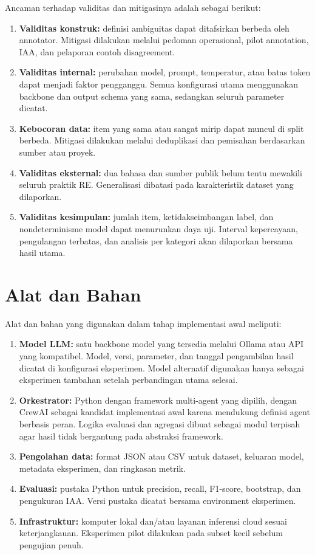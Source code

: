 Ancaman terhadap validitas dan mitigasinya adalah sebagai berikut:
\begin{enumerate}
\item \textbf{Validitas konstruk:} definisi ambiguitas dapat ditafsirkan berbeda oleh annotator. Mitigasi dilakukan melalui pedoman operasional, pilot annotation, IAA, dan pelaporan contoh disagreement.
\item \textbf{Validitas internal:} perubahan model, prompt, temperatur, atau batas token dapat menjadi faktor pengganggu. Semua konfigurasi utama menggunakan backbone dan output schema yang sama, sedangkan seluruh parameter dicatat.
\item \textbf{Kebocoran data:} item yang sama atau sangat mirip dapat muncul di split berbeda. Mitigasi dilakukan melalui deduplikasi dan pemisahan berdasarkan sumber atau proyek.
\item \textbf{Validitas eksternal:} dua bahasa dan sumber publik belum tentu mewakili seluruh praktik RE. Generalisasi dibatasi pada karakteristik dataset yang dilaporkan.
\item \textbf{Validitas kesimpulan:} jumlah item, ketidakseimbangan label, dan nondeterminisme model dapat menurunkan daya uji. Interval kepercayaan, pengulangan terbatas, dan analisis per kategori akan dilaporkan bersama hasil utama.
\end{enumerate}

\section{Alat dan Bahan}

Alat dan bahan yang digunakan dalam tahap implementasi awal meliputi:
\begin{enumerate}
\item \textbf{Model LLM:} satu backbone model yang tersedia melalui Ollama atau API yang kompatibel. Model, versi, parameter, dan tanggal pengambilan hasil dicatat di konfigurasi eksperimen. Model alternatif digunakan hanya sebagai eksperimen tambahan setelah perbandingan utama selesai.
\item \textbf{Orkestrator:} Python dengan framework multi-agent yang dipilih, dengan CrewAI sebagai kandidat implementasi awal karena mendukung definisi agent berbasis peran. Logika evaluasi dan agregasi dibuat sebagai modul terpisah agar hasil tidak bergantung pada abstraksi framework.
\item \textbf{Pengolahan data:} format JSON atau CSV untuk dataset, keluaran model, metadata eksperimen, dan ringkasan metrik.
\item \textbf{Evaluasi:} pustaka Python untuk precision, recall, F1-score, bootstrap, dan pengukuran IAA. Versi pustaka dicatat bersama environment eksperimen.
\item \textbf{Infrastruktur:} komputer lokal dan/atau layanan inferensi cloud sesuai keterjangkauan. Eksperimen pilot dilakukan pada subset kecil sebelum pengujian penuh.
\end{enumerate}

